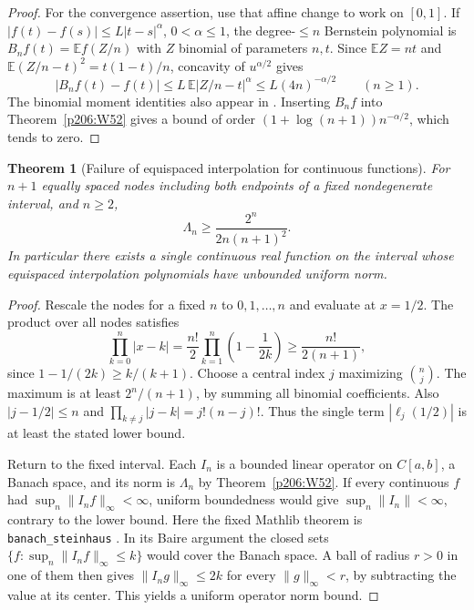 \documentclass[11pt,oneside,openany]{book}
\theoremstyle{plain}
\newtheorem{theorem}{Theorem}[chapter]
\theoremstyle{definition}
\theoremstyle{remark}
\begin{document}
\begin{proof}
For the convergence assertion, use that affine change to work on
\([0,1]\). If \(|f(t)-f(s)|\le L|t-s|^\alpha\), \(0<\alpha\le1\),
the degree-\(\le n\) Bernstein polynomial is
\(B_nf(t)=\mathbb E f(Z/n)\) with \(Z\) binomial of parameters
\(n,t\). Since \(\mathbb E Z=nt\) and
\(\mathbb E(Z/n-t)^2=t(1-t)/n\), concavity of \(u^{\alpha/2}\)
gives
\[
 |B_nf(t)-f(t)|
 \le L\,\mathbb E|Z/n-t|^\alpha
 \le L(4n)^{-\alpha/2}\qquad (n\ge1).
\]
The binomial moment identities also appear in
\cite[\texttt{K03.16.bernstein}]{d03}. Inserting \(B_nf\) into
Theorem~\ref{p206:W52} gives a bound of order
\((1+\log(n+1))n^{-\alpha/2}\), which tends to zero.
\end{proof}

\begin{theorem}[Failure of equispaced interpolation for continuous functions]\label{p206:W54}
For \(n+1\) equally spaced nodes including both endpoints of a
fixed nondegenerate interval, and \(n\ge2\),
\[
  \Lambda_n\ge\frac{2^n}{2n(n+1)^2}.
\]
In particular there exists a single continuous real function
on the interval whose equispaced interpolation polynomials
have unbounded uniform norm.
\end{theorem}

\begin{proof}
Rescale the nodes for a fixed \(n\) to \(0,1,\ldots,n\) and
evaluate at \(x=1/2\). The product over all nodes satisfies
\[
 \prod_{k=0}^n|x-k|
   =\frac{n!}{2}\prod_{k=1}^n\left(1-\frac{1}{2k}\right)
   \ge\frac{n!}{2(n+1)},
\]
since \(1-1/(2k)\ge k/(k+1)\). Choose a central index \(j\)
maximizing \(\binom nj\). The maximum is at least
\(2^n/(n+1)\), by summing all binomial coefficients.
Also \(|j-1/2|\le n\) and
\(\prod_{k\ne j}|j-k|=j!(n-j)!\). Thus the single term
\(|\ell_j(1/2)|\) is at least the stated lower bound.

Return to the fixed interval. Each \(I_n\) is a bounded linear
operator on \(C[a,b]\), a Banach space, and its norm is
\(\Lambda_n\) by Theorem~\ref{p206:W52}. If every continuous
\(f\) had \(\sup_n\lVert I_nf\rVert_\infty<\infty\), uniform
boundedness would give \(\sup_n\lVert I_n\rVert<\infty\),
contrary to the lower bound. Here the fixed Mathlib theorem is
\texttt{banach\_steinhaus} \cite{mathlib}. In its Baire argument
the closed sets \(\{f:\sup_n\lVert I_nf\rVert_\infty\le k\}\)
would cover the Banach space. A ball of radius \(r>0\) in one
of them then gives \(\lVert I_n g\rVert_\infty\le2k\) for
every \(\lVert g\rVert_\infty<r\), by subtracting the value
at its center. This yields a uniform operator norm bound.
\end{proof}
\end{document}
